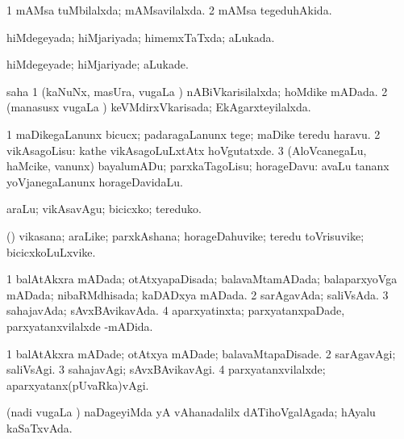 \bentry
{} 
\gl{\gu}
\expl{}
\bmng
\bnum
\num{1} mAMsa tuMbilalxda; mAMsavilalxda. 
\num{2} mAMsa tegeduhAkida. 
\enum
\emng
\eentry

\bentry
{} 
\gl{\gu}
\expl{}
\bmng
 hiMdegeyada; hiMjariyada; himemxTaTxda; aLukada. 
\emng
\eentry

\bentry
{} 
\gl{\kirxvi}
\expl{}
\bmng
 hiMdegeyade; hiMjariyade; aLukade. 
\emng
\eentry

\bentry
{} 
\gl{\gu}
\expl{}
\bmng
  saha
\bnum
\num{1} (kaNuNx, masUra, \mo vugaLa \vi) nABiVkarisilalxda; hoMdike mADada. 
\num{2} (manasusx \mo vugaLa \vi) keVMdirxVkarisada; EkAgarxteyilalxda. 
\enum
\emng
\eentry

\bentry
{} 
\gl{\sakirx}
\expl{}
\bmng
\bnum
\num{1} maDikegaLanunx bicucx; padaragaLanunx tege; maDike teredu haravu. 
\num{2} vikAsagoLisu:  kathe vikAsagoLuLxtAtx hoVgutatxde. 
\num{3} (AloVcanegaLu, haMcike, \mo vanunx) bayalumADu; parxkaTagoLisu; horageDavu:  avaLu tananx yoVjanegaLanunx horageDavidaLu. 
\enum
\emng

\noindent 
\gl{\akirx}
\expl{}
\bmng
araLu; vikAsavAgu; bicicxko; tereduko. 
\emng
\eentry

\bentry
{} 
\gl{\nA}
\expl{}
\bmng
 (\ame) vikasana; araLike; parxkAshana; horageDahuvike; teredu toVrisuvike; bicicxkoLuLxvike. 
\emng
\eentry

\bentry
{} 
\gl{\gu}
\expl{}
\bmng
\bnum
\num{1} balAtAkxra mADada; otAtxyapaDisada; balavaMtamADada; balaparxyoVga mADada; nibaRMdhisada; kaDADxya mADada. 
\num{2} sarAgavAda; saliVsAda. 
\num{3} sahajavAda; sAvxBAvikavAda. 
\num{4} aparxyatinxta; parxyatanxpaDade, parxyatanxvilalxde -mADida. 
\enum
\emng
\eentry

\bentry
{} 
\gl{\kirxvi}
\expl{}
\bmng
\bnum
\num{1} balAtAkxra mADade; otAtxya mADade; balavaMtapaDisade. 
\num{2} sarAgavAgi; saliVsAgi. 
\num{3} sahajavAgi; sAvxBAvikavAgi. 
\num{4} parxyatanxvilalxde; aparxyatanx(pUvaRka)vAgi. 
\enum
\emng
\eentry

\bentry
{} 
\gl{\gu}
\expl{}
\bmng
 (nadi \mo vugaLa \vi) naDageyiMda yA vAhanadalilx dATihoVgalAgada; hAyalu kaSaTxvAda. 
\emng
\eentry

